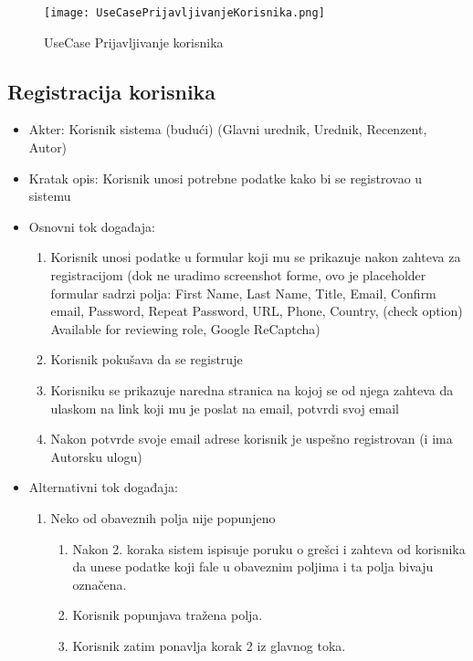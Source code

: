 \documentclass[a4paper]{article}
\begin{document}
\begin{figure}[hbt!]
    \centering
    \texttt{[image: UseCasePrijavljivanjeKorisnika.png]}
    \caption{UseCase Prijavljivanje korisnika}
    \label{fig:my_label}
\end{figure}

\subsection{Registracija korisnika}
\begin{itemize}
    \item Akter: Korisnik sistema (budući) (Glavni urednik, Urednik, Recenzent, Autor)
    \item Kratak opis: Korisnik unosi potrebne podatke kako bi se registrovao u sistemu
    \item Osnovni tok događaja:
        \begin{enumerate}
            \item Korisnik unosi podatke u formular koji mu se prikazuje nakon zahteva za registracijom (dok ne uradimo screenshot forme, ovo je placeholder formular sadrzi polja: First Name, Last Name, Title, Email, Confirm email, Password, Repeat Password, URL, Phone, Country, (check option) Available for reviewing role, Google ReCaptcha)
            \item Korisnik pokušava da se registruje
            \item Korisniku se prikazuje naredna stranica na kojoj se od njega zahteva da ulaskom na link koji mu je poslat na email, potvrdi svoj email
            \item Nakon potvrde svoje email adrese korisnik je uspešno registrovan (i ima Autorsku ulogu)
        \end{enumerate}
    \item Alternativni tok događaja:
        \begin{enumerate}
            \item Neko od obaveznih polja nije popunjeno
                \begin{enumerate}
                    \item Nakon 2. koraka sistem ispisuje poruku o grešci i zahteva od korisnika da unese podatke koji fale u obaveznim poljima i ta polja bivaju označena.
                    \item Korisnik popunjava tražena polja.
                    \item Korisnik zatim ponavlja korak 2 iz glavnog toka.
                \end{enumerate}

\end{enumerate}
\end{itemize}
\end{document}
